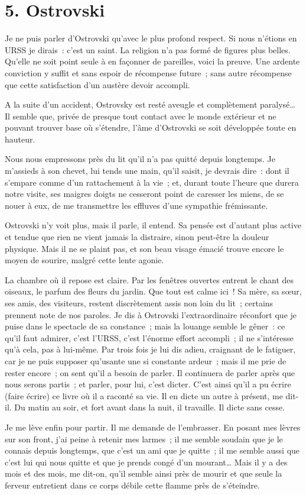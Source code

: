 \documentclass[french,twoside]{book} %
\begin{document}
\section[{5. Ostrovski}]{5. Ostrovski}

\noindent Je ne puis parler d’Ostrovski qu’avec le plus profond respect. Si nous n’étions en URSS je dirais : c’est un saint. La religion n’a pas formé de figures plus belles. Qu’elle ne soit point seule à en façonner de pareilles, voici la preuve. Une ardente conviction y suffit et sans espoir de récompense future ; sans autre récompense que cette satisfaction d’un austère devoir accompli.\par
A la suite d’un accident, Ostrovsky est resté aveugle et complètement paralysé… Il semble que, privée de presque tout contact avec le monde extérieur et ne pouvant trouver base où s’étendre, l’âme d’Ostrovski se soit développée toute en hauteur.\par
Nous nous empressons près du lit qu’il n’a pas quitté depuis longtemps. Je m’assieds à son chevet, lui tends une main, qu’il saisit, je devrais dire : dont il s’empare comme d’un rattachement à la vie ; et, durant toute l’heure que durera notre visite, ses maigres doigts ne cesseront point de caresser les miens, de se nouer à eux, de me transmettre les effluves d’une sympathie frémissante.\par
Ostrovski n’y voit plus, mais il parle, il entend. Sa pensée est d’autant plus active et tendue que rien ne vient jamais la distraire, sinon peut-être la douleur physique. Mais il ne se plaint pas, et son beau visage émacié trouve encore le moyen de sourire, malgré cette lente agonie.\par
La chambre où il repose est claire. Par les fenêtres ouvertes entrent le chant des oiseaux, le parfum des fleurs du jardin. Que tout est calme ici ! Sa mère, sa sœur, ses amis, des visiteurs, restent discrètement assis non loin du lit ; certains prennent note de nos paroles. Je dis à Ostrovski l’extraordinaire réconfort que je puise dans le spectacle de sa constance ; mais la louange semble le gêner : ce qu’il faut admirer, c’est l’URSS, c’est l’énorme effort accompli ; il ne s’intéresse qu’à cela, pas à lui-même. Par trois fois je lui dis adieu, craignant de le fatiguer, car je ne puis supposer qu’usante une si constante ardeur ; mais il me prie de rester encore ; on sent qu’il a besoin de parler. Il continuera de parler après que nous serons partis ; et parler, pour lui, c’est dicter. C’est ainsi qu’il a pu écrire (faire écrire) ce livre où il a raconté sa vie. Il en dicte un autre à présent, me dit-il. Du matin au soir, et fort avant dans la nuit, il travaille. Il dicte sans cesse.\par
Je me lève enfin pour partir. Il me demande de l’embrasser. En posant mes lèvres sur son front, j’ai peine à retenir mes larmes ; il me semble soudain que je le connais depuis longtemps, que c’est un ami que je quitte ; il me semble aussi que c’est lui qui nous quitte et que je prends congé d’un mourant… Mais il y a des mois et des mois, me dit-on, qu’il semble ainsi près de mourir et que seule la ferveur entretient dans ce corps débile cette flamme près de s’éteindre.
\end{document}
